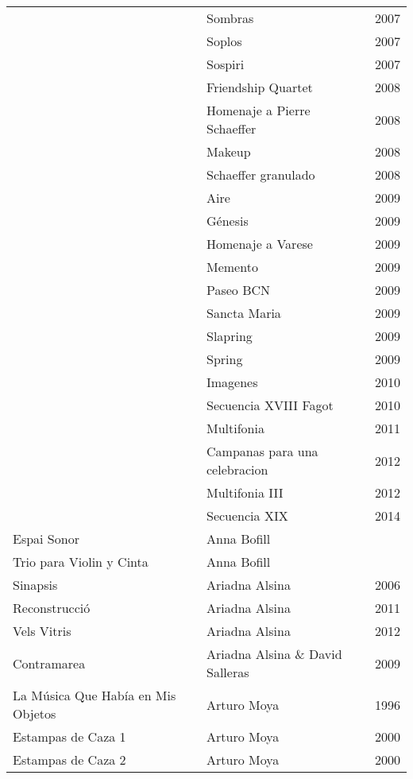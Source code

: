 \begin{center}
\begin{longtable}{ p{}  p{}  p{} }
& Sombras & 2007 \\ \cmidrule (r){2-3} 
& Soplos & 2007 \\ \cmidrule (r){2-3} 
& Sospiri & 2007 \\ \cmidrule (r){2-3} 
& Friendship Quartet & 2008 \\ \cmidrule (r){2-3} 
& Homenaje a Pierre Schaeffer & 2008 \\ \cmidrule (r){2-3} 
& Makeup & 2008 \\ \cmidrule (r){2-3} 
& Schaeffer granulado & 2008 \\ \cmidrule (r){2-3} 
& Aire & 2009 \\ \cmidrule (r){2-3} 
& Génesis & 2009 \\ \cmidrule (r){2-3} 
& Homenaje a Varese & 2009 \\ \cmidrule (r){2-3} 
& Memento & 2009 \\ \cmidrule (r){2-3} 
& Paseo BCN & 2009 \\ \cmidrule (r){2-3} 
& Sancta Maria & 2009 \\ \cmidrule (r){2-3} 
& Slapring & 2009 \\ \cmidrule (r){2-3} 
& Spring & 2009 \\ \cmidrule (r){2-3} 
& Imagenes & 2010 \\ \cmidrule (r){2-3} 
& Secuencia XVIII Fagot & 2010 \\ \cmidrule (r){2-3} 
& Multifonia & 2011 \\ \cmidrule (r){2-3} 
& Campanas para una celebracion & 2012 \\ \cmidrule (r){2-3} 
& Multifonia III & 2012 \\ \cmidrule (r){2-3} 
& Secuencia XIX & 2014 \\ \midrule
Espai Sonor & Anna Bofill &  \\ \midrule 
Trio para Violin y Cinta & Anna Bofill &  \\ \midrule 
Sinapsis & Ariadna Alsina & 2006 \\ \midrule 
Reconstrucció & Ariadna Alsina & 2011 \\ \midrule 
Vels Vitris & Ariadna Alsina & 2012 \\ \midrule 
Contramarea & Ariadna Alsina \& David Salleras & 2009 \\ \midrule 
La Música Que Había en Mis Objetos & Arturo Moya & 1996 \\ \midrule 
Estampas de Caza 1 & Arturo Moya & 2000 \\ \midrule 
Estampas de Caza 2 & Arturo Moya & 2000 \\ \midrule 

\end{longtable}
\end{center}
